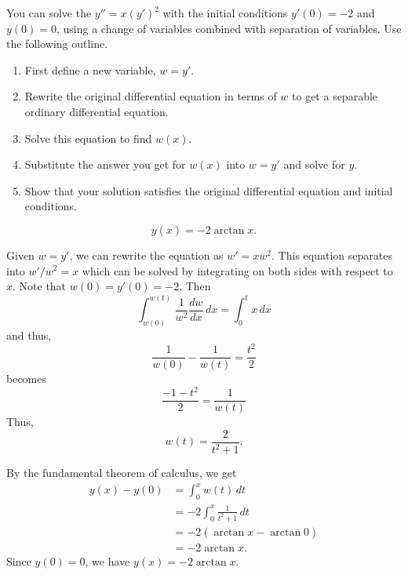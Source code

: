 \documentclass[12 pt, letterpaper]{hmcpset}
\begin{document}
\begin{problem}[6:]
	You can solve the $y'' = x (y')^{2}$ with the initial conditions $y'(0) = -2$ and $y(0) = 0$, using a change of variables combined with separation of variables. Use the following outline.
	\begin{enumerate}
		\item First define a new variable, $w = y'$.
		\item Rewrite the original differential equation in terms of $w$ to get a separable ordinary differential equation.
		\item Solve this equation to find $w(x)$.
		\item Substitute the answer you get for $w(x)$ into $w = y'$ and solve for $y$.
		\item Show that your solution satisfies the original differential equation and initial conditions.
	\end{enumerate}
\end{problem}

\begin{solution}
	\[
		\boxed{
			y(x) = -2 \arctan{x}.
		}
	\]

	Given  $w = y'$, we can rewrite the equation as $w' = x w^{2}$. This equation separates into $w'/w^{2} = x$ which can be solved by integrating on both sides with respect to $x$. Note that $w(0) = y'(0) = -2$. Then
	\[
		\int_{w(0)}^{w(t)} \frac{1}{w^{2}} \frac{dw}{dx} \, dx = \int_{0}^{t} x \, dx
	\]
	and thus,
	\[
		\frac{1}{w(0)} - \frac{1}{w(t)} = \frac{t^{2}}{2}
	\]
	becomes
	\[
		\frac{-1 - t^{2}}{2} = \frac{1}{w(t)}
	\]
	Thus,
	\[
		w(t) = \frac{2}{t^{2} + 1}.
	\]

	By the fundamental theorem of calculus, we get
	\[
		\begin{split}
			y(x) - y(0) & = \int_{0}^{x} w(t) \, dt \\
				    & = -2 \int_{0}^{x} \frac{1}{t^{2} + 1} \, dt \\
				    & = -2 (\arctan{x} - \arctan{0}) \\
				    & = -2 \arctan{x}.
		\end{split}
	\]
	Since $y(0) = 0$, we have  $y(x) = -2 \arctan{x}$.
\end{solution}
\end{document}
